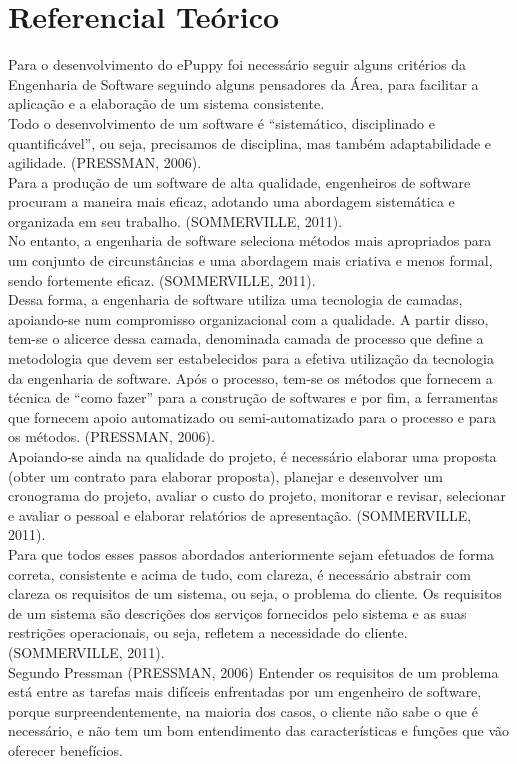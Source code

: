 \chapter{Referencial Teórico}
Para o desenvolvimento do ePuppy foi necessário seguir alguns critérios da Engenharia de Software seguindo alguns pensadores da Área, para facilitar a aplicação e a elaboração de um sistema consistente.
\\
\indent
Todo o desenvolvimento de um software é “sistemático, disciplinado e quantificável”, ou seja, precisamos de disciplina, mas também adaptabilidade e agilidade. (PRESSMAN, 2006).
\\
\indent
Para a produção de um software de alta qualidade, engenheiros de software procuram a maneira mais eficaz, adotando uma abordagem sistemática e organizada em seu trabalho. (SOMMERVILLE, 2011).
\\
\indent
No entanto, a engenharia de software seleciona métodos mais apropriados para um conjunto de circunstâncias e uma abordagem mais criativa e menos formal, sendo fortemente eficaz. (SOMMERVILLE, 2011).
\\
\indent
Dessa forma, a engenharia de software utiliza uma tecnologia de camadas, apoiando-se num compromisso organizacional com a qualidade. A partir disso, tem-se o alicerce dessa camada, denominada camada de processo que define a metodologia que devem ser estabelecidos para a efetiva utilização da tecnologia da engenharia de software. Após o processo, tem-se os métodos que fornecem a técnica de “como fazer” para a construção de softwares e por fim, a ferramentas que fornecem apoio automatizado ou semi-automatizado para o processo e para os métodos. (PRESSMAN, 2006).
\\
\indent
Apoiando-se ainda na qualidade do projeto, é necessário elaborar uma proposta (obter um contrato para elaborar proposta), planejar e desenvolver um cronograma do projeto, avaliar o custo do projeto, monitorar e revisar, selecionar e avaliar o pessoal e elaborar relatórios de apresentação. (SOMMERVILLE, 2011).
\\
\indent
Para que todos esses passos abordados anteriormente sejam efetuados de forma correta, consistente e acima de tudo, com clareza, é necessário abstrair com clareza os requisitos de um sistema, ou seja, o problema do cliente. Os requisitos de um sistema são descrições dos serviços fornecidos pelo sistema e as suas restrições operacionais, ou seja, refletem a necessidade do cliente. (SOMMERVILLE, 2011).
\\
\indent
Segundo Pressman (PRESSMAN, 2006) Entender os requisitos de um problema está entre as tarefas mais difíceis enfrentadas por um engenheiro de software, porque surpreendentemente, na maioria dos casos, o cliente não sabe o que é necessário, e não tem um bom entendimento das características e funções que vão oferecer benefícios.
